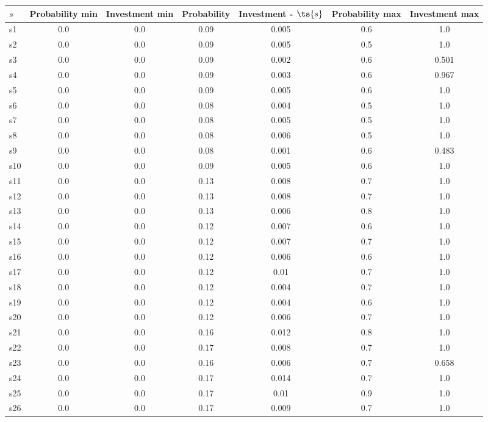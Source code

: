 \documentclass{article}
\begin{document}
\noindent\begin{tabular}{|l|c|c|c|c|c|c|}
\hline
$s$& Probability min & Investment min & Probability & Investment - $\ts{s}$ & Probability max & Investment max\\
\hline
s1 &0.0 & 0.0 & 0.09 & 0.005 & 0.6 & 1.0\\
\hline
s2 &0.0 & 0.0 & 0.09 & 0.005 & 0.5 & 1.0\\
\hline
s3 &0.0 & 0.0 & 0.09 & 0.002 & 0.6 & 0.501\\
\hline
s4 &0.0 & 0.0 & 0.09 & 0.003 & 0.6 & 0.967\\
\hline
s5 &0.0 & 0.0 & 0.09 & 0.005 & 0.6 & 1.0\\
\hline
s6 &0.0 & 0.0 & 0.08 & 0.004 & 0.5 & 1.0\\
\hline
s7 &0.0 & 0.0 & 0.08 & 0.005 & 0.5 & 1.0\\
\hline
s8 &0.0 & 0.0 & 0.08 & 0.006 & 0.5 & 1.0\\
\hline
s9 &0.0 & 0.0 & 0.08 & 0.001 & 0.6 & 0.483\\
\hline
s10 &0.0 & 0.0 & 0.09 & 0.005 & 0.6 & 1.0\\
\hline
s11 &0.0 & 0.0 & 0.13 & 0.008 & 0.7 & 1.0\\
\hline
s12 &0.0 & 0.0 & 0.13 & 0.008 & 0.7 & 1.0\\
\hline
s13 &0.0 & 0.0 & 0.13 & 0.006 & 0.8 & 1.0\\
\hline
s14 &0.0 & 0.0 & 0.12 & 0.007 & 0.6 & 1.0\\
\hline
s15 &0.0 & 0.0 & 0.12 & 0.007 & 0.7 & 1.0\\
\hline
s16 &0.0 & 0.0 & 0.12 & 0.006 & 0.6 & 1.0\\
\hline
s17 &0.0 & 0.0 & 0.12 & 0.01 & 0.7 & 1.0\\
\hline
s18 &0.0 & 0.0 & 0.12 & 0.004 & 0.7 & 1.0\\
\hline
s19 &0.0 & 0.0 & 0.12 & 0.004 & 0.6 & 1.0\\
\hline
s20 &0.0 & 0.0 & 0.12 & 0.006 & 0.7 & 1.0\\
\hline
s21 &0.0 & 0.0 & 0.16 & 0.012 & 0.8 & 1.0\\
\hline
s22 &0.0 & 0.0 & 0.17 & 0.008 & 0.7 & 1.0\\
\hline
s23 &0.0 & 0.0 & 0.16 & 0.006 & 0.7 & 0.658\\
\hline
s24 &0.0 & 0.0 & 0.17 & 0.014 & 0.7 & 1.0\\
\hline
s25 &0.0 & 0.0 & 0.17 & 0.01 & 0.9 & 1.0\\
\hline
s26 &0.0 & 0.0 & 0.17 & 0.009 & 0.7 & 1.0\\

\end{tabular}
\end{document}
